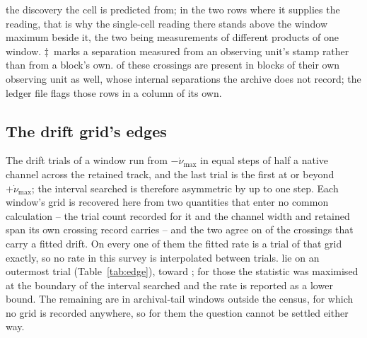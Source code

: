 \begin{table}
{the discovery the cell is predicted from; in the two rows where it supplies
the reading, that is why the single-cell reading there stands above the
window maximum beside it, the two being measurements of different products of
one window. $\ddagger$~marks a separation measured
from an observing unit's stamp rather than from a block's own.
\QcNUnrecWord{} of these crossings are present in blocks of their own
observing unit as well, whose internal separations the archive does not
record; the ledger file flags those rows in a column of its own.}
\label{tab:confirm}
\small
\setlength{\tabcolsep}{4.5pt}

\end{table}

\subsection{The drift grid's edges}
\label{sec:edge}

The drift trials of a window run from $-\dot\nu_{\max}$ in equal steps of
half a native channel across the retained track, and the last trial is the
first at or beyond $+\dot\nu_{\max}$; the interval searched is therefore
asymmetric by up to one step. Each window's grid is recovered here from two
quantities that enter no common calculation -- the trial count recorded for
it and the channel width and retained span its own crossing record carries
-- and the two agree on \EgNGrid{} of the \EgNDrift{} crossings that carry a
fitted drift. On every one of them the fitted rate is a trial of that grid
exactly, so no rate in this survey is interpolated between trials.
\EgNEdge{} lie on an outermost trial (Table~\ref{tab:edge}), toward
\EgEdgeStars; for those the statistic was maximised at the boundary of the
interval searched and the rate is reported as a lower bound. The remaining
\EgNNoGrid{} are in archival-tail windows outside the census, for which no
grid is recorded anywhere, so for them the question cannot be settled either
way.

